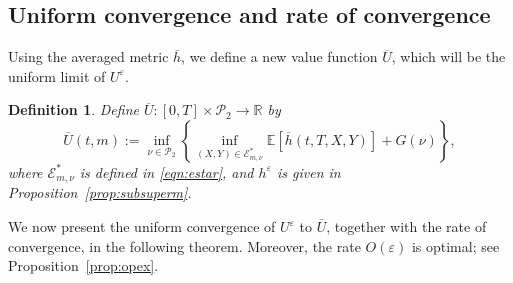 \documentclass[reqno,11pt]{amsart}
\newtheorem{definition}[theorem]{Definition}
\numberwithin{equation}{section}
\newcommand{\R}{\mathbb{R}} %
\newcommand{\ep}{\varepsilon}
\renewcommand{\bar}{\overline}
\begin{document}
\subsection{Uniform convergence and rate of convergence}

Using the averaged metric $\bar{h}$, we define a new value function $\bar{U}$, which will be the uniform limit of $U^\ep$.




\begin{definition} Define $\bar{U} :[0, T] \times \mathcal{P}_2 \to \R $ by
\[
\bar{U}(t,m):=\inf_{\nu\in\mathcal{P}_2}\left\{\inf_{(X, Y) \in \mathcal{E}^\ast_{m,\nu}} \mathbb{E} \left[\bar{h}\left(t, T, X, Y\right)\right]+G(\nu)\right\},
\]
where $\mathcal{E}_{m,\nu}^\ast$ is defined in \eqref{eqn:estar}, and $h^\varepsilon$ is given in Proposition~\ref{prop:subsuperm}.
\end{definition}



We now present the uniform convergence of $U^\varepsilon$ to $\bar U$, together with the rate of convergence, in the following theorem. Moreover, the rate $O(\varepsilon)$ is optimal; see Proposition~\ref{prop:opex}.
\end{document}
